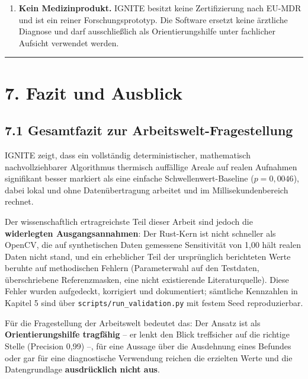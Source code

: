\documentclass[
  11pt,
]{article}
\providecommand{\tightlist}{%
  \setlength{\itemsep}{0pt}\setlength{\parskip}{0pt}}
\begin{document}
\begin{enumerate}
\def\labelenumi{\arabic{enumi}.}
\setcounter{enumi}{14}
\tightlist
\item
  \textbf{Kein Medizinprodukt.} IGNITE besitzt keine Zertifizierung nach
  EU-MDR und ist ein reiner Forschungsprototyp. Die Software ersetzt
  keine ärztliche Diagnose und darf ausschließlich als
  Orientierungshilfe unter fachlicher Aufsicht verwendet werden.
\end{enumerate}

\begin{center}\rule{0.5\linewidth}{0.5pt}\end{center}

\section{7. Fazit und Ausblick}\label{fazit-und-ausblick}

\subsection{7.1 Gesamtfazit zur
Arbeitswelt-Fragestellung}\label{gesamtfazit-zur-arbeitswelt-fragestellung}

IGNITE zeigt, dass ein vollständig deterministischer, mathematisch
nachvollziehbarer Algorithmus thermisch auffällige Areale auf realen
Aufnahmen signifikant besser markiert als eine einfache
Schwellenwert-Baseline (\(p = 0{,}0046\)), dabei lokal und ohne
Datenübertragung arbeitet und im Millisekundenbereich rechnet.

Der wissenschaftlich ertragreichste Teil dieser Arbeit sind jedoch die
\textbf{widerlegten Ausgangsannahmen}: Der Rust-Kern ist nicht schneller
als OpenCV, die auf synthetischen Daten gemessene Sensitivität von 1,00
hält realen Daten nicht stand, und ein erheblicher Teil der ursprünglich
berichteten Werte beruhte auf methodischen Fehlern (Parameterwahl auf
den Testdaten, überschriebene Referenzmasken, eine nicht existierende
Literaturquelle). Diese Fehler wurden aufgedeckt, korrigiert und
dokumentiert; sämtliche Kennzahlen in Kapitel 5 sind über
\texttt{scripts/run\_validation.py} mit festem Seed reproduzierbar.

Für die Fragestellung der Arbeitswelt bedeutet das: Der Ansatz ist als
\textbf{Orientierungshilfe tragfähig} -- er lenkt den Blick treffsicher
auf die richtige Stelle (Precision 0,99) --, für eine Aussage über die
Ausdehnung eines Befundes oder gar für eine diagnostische Verwendung
reichen die erzielten Werte und die Datengrundlage \textbf{ausdrücklich
nicht aus}.
\end{document}
